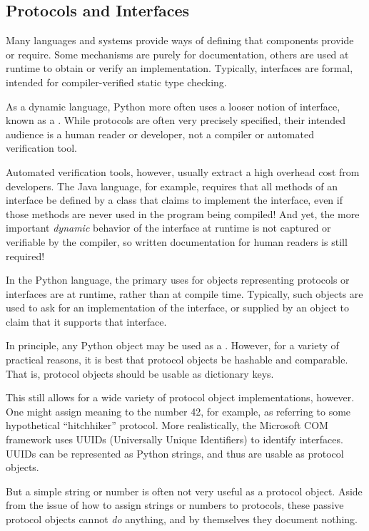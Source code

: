 \subsection{Protocols and Interfaces}

Many languages and systems provide ways of defining  that
components provide or require.  Some mechanisms are purely for documentation,
others are used at runtime to obtain or verify an implementation.  Typically,
interfaces are formal, intended for compiler-verified static type checking.

As a dynamic language, Python more often uses a looser notion of interface,
known as a .  While protocols are often very precisely
specified, their intended audience is a human reader or developer, not a
compiler or automated verification tool.

Automated verification tools, however, usually extract a high overhead cost
from developers.  The Java language, for example, requires that all methods
of an interface be defined by a class that claims to implement the
interface, even if those methods are never used in the program being
compiled!  And yet, the more important \emph{dynamic} behavior of the
interface at runtime is not captured or verifiable by the compiler, so written
documentation for human readers is still required!

In the Python language, the primary uses for objects representing protocols
or interfaces are at runtime, rather than at compile time.  Typically, such
objects are used to ask for an implementation of the interface, or supplied
by an object to claim that it supports that interface.

In principle, any Python object may be used as a .
However, for a variety of practical reasons, it is best that protocol objects
be hashable and comparable.  That is, protocol objects should be usable as
dictionary keys.

This still allows for a wide variety of protocol object implementations,
however.  One might assign meaning to the number 42, for example, as
referring to some hypothetical ``hitchhiker'' protocol.  More realistically,
the Microsoft COM framework uses UUIDs (Universally Unique Identifiers) to
identify interfaces.  UUIDs can be represented as Python strings, and thus
are usable as protocol objects.

But a simple string or number is often not very useful as a protocol
object.  Aside from the issue of how to assign strings or numbers to
protocols, these passive protocol objects cannot \emph{do} anything, and by
themselves they document nothing.

